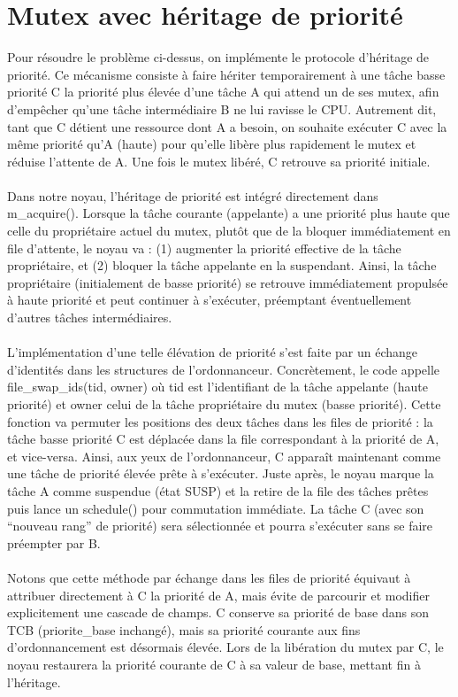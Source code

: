 \documentclass{latexPackage/utc-report/utc-report}
\begin{document}
\pagebreak

\section{Mutex avec héritage de priorité}

Pour résoudre le problème ci-dessus, on implémente le protocole d’héritage de priorité. Ce mécanisme consiste à faire hériter temporairement à une tâche basse priorité C la priorité plus élevée d’une tâche A qui attend un de ses mutex, afin d’empêcher qu’une tâche intermédiaire B ne lui ravisse le CPU. Autrement dit, tant que C détient une ressource dont A a besoin, on souhaite exécuter C avec la même priorité qu’A (haute) pour qu’elle libère plus rapidement le mutex et réduise l’attente de A. Une fois le mutex libéré, C retrouve sa priorité initiale.
\\\\
Dans notre noyau, l’héritage de priorité est intégré directement dans m\_acquire(). Lorsque la tâche courante (appelante) a une priorité plus haute que celle du propriétaire actuel du mutex, plutôt que de la bloquer immédiatement en file d’attente, le noyau va : (1) augmenter la priorité effective de la tâche propriétaire, et (2) bloquer la tâche appelante en la suspendant. Ainsi, la tâche propriétaire (initialement de basse priorité) se retrouve immédiatement propulsée à haute priorité et peut continuer à s’exécuter, préemptant éventuellement d’autres tâches intermédiaires.
\\\\
L’implémentation d’une telle élévation de priorité s’est faite par un échange d’identités dans les structures de l’ordonnanceur. Concrètement, le code appelle file\_swap\_ids(tid, owner) où tid est l’identifiant de la tâche appelante (haute priorité) et owner celui de la tâche propriétaire du mutex (basse priorité). Cette fonction va permuter les positions des deux tâches dans les files de priorité : la tâche basse priorité C est déplacée dans la file correspondant à la priorité de A, et vice-versa. Ainsi, aux yeux de l’ordonnanceur, C apparaît maintenant comme une tâche de priorité élevée prête à s’exécuter. Juste après, le noyau marque la tâche A comme suspendue (état SUSP) et la retire de la file des tâches prêtes puis lance un schedule() pour commutation immédiate. La tâche C (avec son “nouveau rang” de priorité) sera sélectionnée et pourra s’exécuter sans se faire préempter par B.
\\\\
Notons que cette méthode par échange dans les files de priorité équivaut à attribuer directement à C la priorité de A, mais évite de parcourir et modifier explicitement une cascade de champs. C conserve sa priorité de base dans son TCB (priorite\_base inchangé), mais sa priorité courante aux fins d’ordonnancement est désormais élevée. Lors de la libération du mutex par C, le noyau restaurera la priorité courante de C à sa valeur de base, mettant fin à l’héritage.
\end{document}
